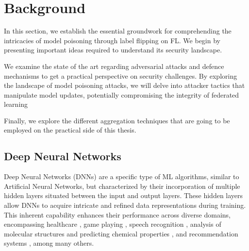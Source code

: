 \section{Background} \label{sec:background}
In this section, we establish the essential groundwork for comprehending the intricacies of model poisoning through label flipping on FL. We begin by presenting important ideas required to understand its security landscape.

We examine the state of the art regarding adversarial attacks and defence mechanisms to get a practical perspective on security challenges. 
By exploring the landscape of model poisoning attacks, we will delve into attacker tactics that manipulate model updates, potentially compromising the integrity of federated learning

Finally, we explore the different aggregation techniques that are going to be employed on the practical side of this thesis.

\subsection{Deep Neural Networks}
Deep Neural Networks (DNNs) are a specific type of ML algorithms, similar to Artificial Neural Networks, but characterized by their incorporation of multiple hidden layers situated between the input and output layers. These hidden layers allow DNNs to acquire intricate and refined data representations during training.
This inherent capability enhances their performance across diverse domains, encompassing healthcare \cite{BreastCancerComputerVision}, game playing \cite{gamePlaying}, speech recognition \cite{speechRecognition}, analysis of molecular structures and predicting chemical properties \cite{MolecularStructure}, and recommendation systems \cite{DNNRecommendation}, among many others.

